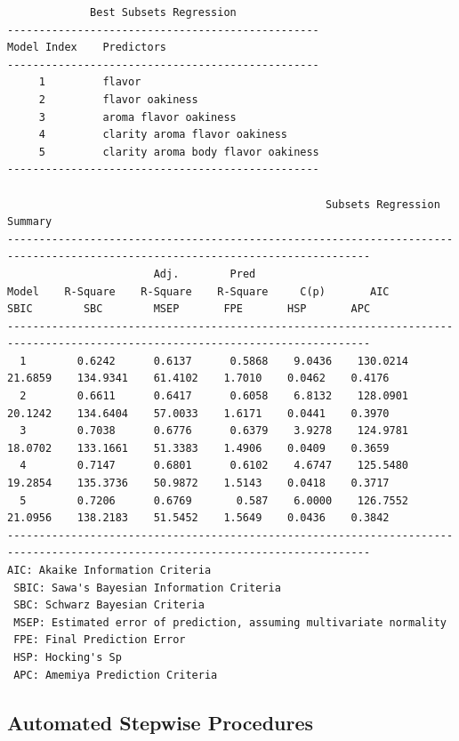 \documentclass[
  letterpaper,
  DIV=11,
  numbers=noendperiod]{scrreprt}
\begin{document}
\begin{verbatim}
             Best Subsets Regression             
-------------------------------------------------
Model Index    Predictors
-------------------------------------------------
     1         flavor                             
     2         flavor oakiness                    
     3         aroma flavor oakiness              
     4         clarity aroma flavor oakiness      
     5         clarity aroma body flavor oakiness 
-------------------------------------------------

                                                  Subsets Regression Summary                                                   
-------------------------------------------------------------------------------------------------------------------------------
                       Adj.        Pred                                                                                         
Model    R-Square    R-Square    R-Square     C(p)       AIC        SBIC        SBC        MSEP       FPE       HSP       APC  
-------------------------------------------------------------------------------------------------------------------------------
  1        0.6242      0.6137      0.5868    9.0436    130.0214    21.6859    134.9341    61.4102    1.7010    0.0462    0.4176 
  2        0.6611      0.6417      0.6058    6.8132    128.0901    20.1242    134.6404    57.0033    1.6171    0.0441    0.3970 
  3        0.7038      0.6776      0.6379    3.9278    124.9781    18.0702    133.1661    51.3383    1.4906    0.0409    0.3659 
  4        0.7147      0.6801      0.6102    4.6747    125.5480    19.2854    135.3736    50.9872    1.5143    0.0418    0.3717 
  5        0.7206      0.6769       0.587    6.0000    126.7552    21.0956    138.2183    51.5452    1.5649    0.0436    0.3842 
-------------------------------------------------------------------------------------------------------------------------------
AIC: Akaike Information Criteria 
 SBIC: Sawa's Bayesian Information Criteria 
 SBC: Schwarz Bayesian Criteria 
 MSEP: Estimated error of prediction, assuming multivariate normality 
 FPE: Final Prediction Error 
 HSP: Hocking's Sp 
 APC: Amemiya Prediction Criteria 
\end{verbatim}

\subsection{Automated Stepwise
Procedures}\label{automated-stepwise-procedures}
\end{document}
